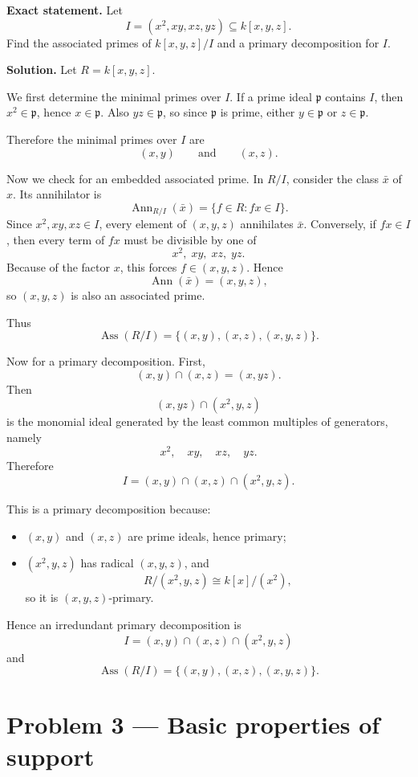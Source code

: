 \documentclass[12pt,a4paper]{article}
\theoremstyle{plain}
\theoremstyle{definition}      %
\begin{document}
	\textbf{Exact statement.}
	Let
	\[
	I=(x^2,xy,xz,yz)\subseteq k[x,y,z].
	\]
	Find the associated primes of \(k[x,y,z]/I\) and a primary decomposition for \(I\).
	
	\textbf{Solution.}
	Let \(R=k[x,y,z]\).
	
	We first determine the minimal primes over \(I\).
	If a prime ideal \(\mathfrak p\) contains \(I\), then \(x^2\in\mathfrak p\), hence \(x\in\mathfrak p\).
	Also \(yz\in\mathfrak p\), so since \(\mathfrak p\) is prime, either \(y\in\mathfrak p\) or \(z\in\mathfrak p\).
	
	Therefore the minimal primes over \(I\) are
	\[
	(x,y)\qquad\text{and}\qquad (x,z).
	\]
	
	Now we check for an embedded associated prime.
	In \(R/I\), consider the class \(\bar x\) of \(x\).
	Its annihilator is
	\[
	\operatorname{Ann}_{R/I}(\bar x)
	=\{f\in R: fx\in I\}.
	\]
	Since \(x^2,xy,xz\in I\), every element of \((x,y,z)\) annihilates \(\bar x\).
	Conversely, if \(fx\in I\), then every term of \(fx\) must be divisible by one of
	\[
	x^2,\;xy,\;xz,\;yz.
	\]
	Because of the factor \(x\), this forces \(f\in (x,y,z)\).
	Hence
	\[
	\operatorname{Ann}(\bar x)=(x,y,z),
	\]
	so \((x,y,z)\) is also an associated prime.
	
	Thus
	\[
	\operatorname{Ass}(R/I)=\{(x,y),(x,z),(x,y,z)\}.
	\]
	
	Now for a primary decomposition.
	First,
	\[
	(x,y)\cap (x,z)=(x,yz).
	\]
	Then
	\[
	(x,yz)\cap (x^2,y,z)
	\]
	is the monomial ideal generated by the least common multiples of generators, namely
	\[
	x^2,\quad xy,\quad xz,\quad yz.
	\]
	Therefore
	\[
	I=(x,y)\cap (x,z)\cap (x^2,y,z).
	\]
	
	This is a primary decomposition because:
	\begin{itemize}
		\item \((x,y)\) and \((x,z)\) are prime ideals, hence primary;
		\item \((x^2,y,z)\) has radical \((x,y,z)\), and
		\[
		R/(x^2,y,z)\cong k[x]/(x^2),
		\]
		so it is \((x,y,z)\)-primary.
	\end{itemize}
	
	Hence an irredundant primary decomposition is
	\[
	\boxed{I=(x,y)\cap (x,z)\cap (x^2,y,z)}
	\]
	and
	\[
	\boxed{\operatorname{Ass}(R/I)=\{(x,y),(x,z),(x,y,z)\}.}
	\]
	
	\section*{Problem 3 --- Basic properties of support}
	
\end{document}
